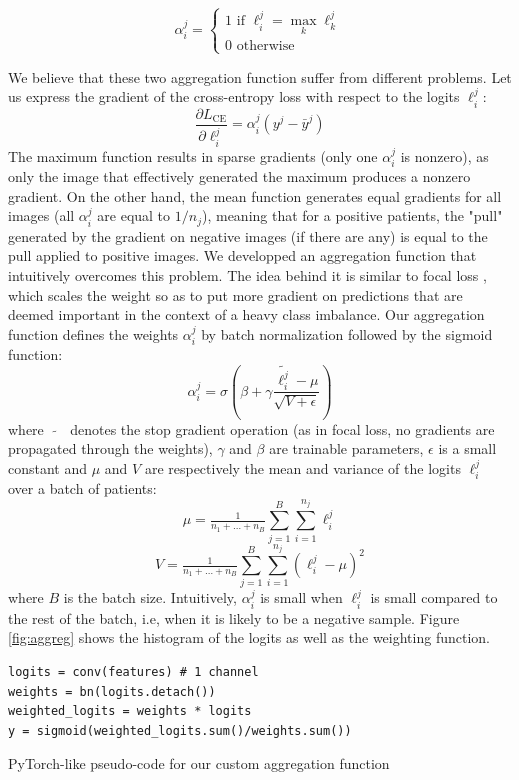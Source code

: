\documentclass[final]{cvpr}
\begin{document}
	$$
	\alpha_i^j  = \left\{
	\begin{array}{ll}
		1 \text{ if } \ell_i^j = \max_k \ell_k^j  \\
		0 \text{ otherwise}
	\end{array}
	\right.
	$$
	
	\vspace{1mm}
	\noindent
	We believe that these two aggregation function suffer from different problems. Let us express the gradient of the cross-entropy loss with respect to the logits $\ell_i^j$:
	$$\frac{\partial L_{\text{CE}}}{\partial \ell_i^j} = \alpha_i^j \left(y^j - \bar{y}^j\right)$$
	The maximum function results in sparse gradients (only one $\alpha_i^j$ is nonzero), as only the image that effectively generated the maximum produces a nonzero gradient. On the other hand, the mean function generates equal gradients for all images (all $\alpha_i^j$ are equal to $1/n_j$), meaning that for a positive patients, the "pull" generated by the gradient on negative images (if there are any) is equal to the pull applied to positive images. We developped an aggregation function that intuitively overcomes this problem.
	The idea behind it is similar to focal loss \cite{focal}, which scales the weight so as to put more gradient on predictions that are deemed important in the context of a heavy class imbalance.
	Our aggregation function defines the weights $\alpha_i^j$ by batch normalization \cite{bn} followed by the sigmoid function:
	$$ \alpha_i^j = \sigma\left(\beta + \gamma \frac{\widetilde{\ell_i^j} - \mu}{\sqrt{V+\epsilon}}\right) $$
	where $\; \widetilde{\text{ }} \;$ denotes the stop gradient operation (as in focal loss, no gradients are propagated through the weights), $\gamma$ and $\beta$ are trainable parameters, $\epsilon$ is a small constant and $\mu$ and $V$ are respectively the mean and variance of the logits $\ell_i^j$ over a batch of patients:
	$$\mu = \tfrac 1 {n_1+\dots+n_B} \sum_{j=1}^{B} \sum_{i=1}^{n_j} \ell_i^j$$
	$$V = \tfrac 1 {n_1+\dots+n_B} \sum_{j=1}^{B} \sum_{i=1}^{n_j} \left(\ell_i^j - \mu \right)^2$$
	where $B$ is the batch size. Intuitively, $\alpha_i^j$ is small when $\ell_i^j$ is small compared to the rest of the batch, i.e, when it is likely to be a negative sample.
	Figure \ref{fig:aggreg} shows the histogram of the logits as well as the weighting function.
	
	\begin{table}[h]
		\renewcommand\tablename{Pseudo-code}
		\begin{Verbatim}[fontsize=\footnotesize, samepage=true, frame=single]
logits = conv(features) # 1 channel
weights = bn(logits.detach())
weighted_logits = weights * logits
y = sigmoid(weighted_logits.sum()/weights.sum())
		\end{Verbatim}
		\caption{PyTorch-like pseudo-code for our custom aggregation function}
		\label{alg2}
	\end{table}
	
\end{document}
